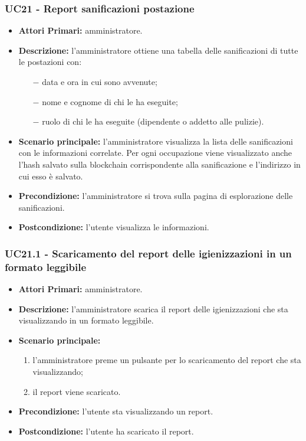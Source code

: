 \subsubsection{ UC21 - Report sanificazioni postazione}
\begin{itemize}
           	\item\textbf{Attori Primari:} 
           	amministratore.
           	\item\textbf{Descrizione:} 
           	l'amministratore ottiene una tabella delle sanificazioni di tutte le postazioni con:
           	\begin{itemize}
           		\item[$-$] data e ora in cui sono avvenute;
           		\item[$-$] nome e cognome di chi le ha eseguite;
           		\item[$-$] ruolo di chi le ha eseguite (dipendente o addetto alle pulizie).
           	\end{itemize}
           	\item\textbf{Scenario principale:} 
           	l'amministratore visualizza la lista delle sanificazioni con le informazioni correlate. Per ogni occupazione viene visualizzato anche l'hash salvato sulla blockchain corrispondente alla sanificazione e l'indirizzo in cui esso è salvato.
           	\item\textbf{Precondizione:} 
           	l'amministratore si trova sulla pagina di esplorazione delle sanificazioni.
           	\item\textbf{Postcondizione:}
           	l'utente visualizza le informazioni.
\end{itemize}

\subsubsection{ UC21.1 - Scaricamento del report delle igienizzazioni in un formato leggibile}
\begin{itemize}
	\item\textbf{Attori Primari:} 
	amministratore.
	\item\textbf{Descrizione:} 
	l'amministratore scarica il report delle igienizzazioni che sta visualizzando in un formato leggibile.
	\item\textbf{Scenario principale:} 
	\begin{enumerate}
		\item l'amministratore preme un pulsante per lo scaricamento del report che sta visualizzando;
		\item il report viene scaricato.
	\end{enumerate}
	\item\textbf{Precondizione:} 
	l'utente sta visualizzando un report.
	\item\textbf{Postcondizione:}
	l'utente ha scaricato il report.
\end{itemize}

